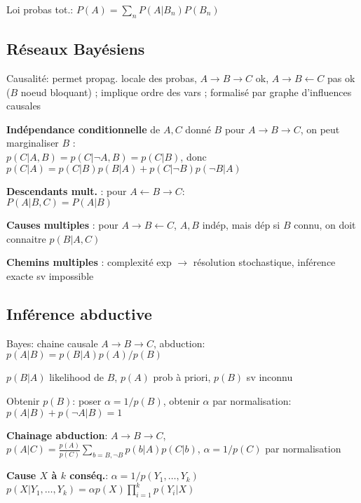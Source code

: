 Loi probas tot.: $P(A) = \sum_n P(A|B_n)P(B_n)$

\subsection*{Réseaux Bayésiens}

Causalité: permet propag. locale des probas, $A \rightarrow B \rightarrow C$ ok, $A \rightarrow B \leftarrow C$ pas ok ($B$ noeud bloquant) ; implique ordre des vars ; formalisé par graphe d'influences causales


\textbf{Indépendance conditionnelle} de $A, C$ donné $B$ pour $A \rightarrow B \rightarrow C$, on peut marginaliser $B$ : \\
$p(C|A, B) = p(C|\lnot A, B) = p(C|B)$, donc \\
$p(C|A) = p(C|B)p(B|A) + p(C|\lnot B)p(\lnot B|A)$

\textbf{Descendants mult.} : pour $A \leftarrow B \rightarrow C$:\\ 
$P(A|B, C) = P(A|B)$

\textbf{Causes multiples} : pour $A \rightarrow B \leftarrow C$, $A, B$ indép, mais dép si $B$ connu, on doit connaitre $p(B|A,C)$

\textbf{Chemins multiples} : complexité exp $\rightarrow$ résolution stochastique, inférence exacte sv impossible


\subsection*{Inférence abductive}

Bayes: chaine causale $A \rightarrow B \rightarrow C$, abduction: $p(A|B) = p(B|A)p(A) / p(B)$

$p(B|A)$ likelihood de $B$, $p(A)$ prob à priori, $p(B)$ sv inconnu

Obtenir $p(B)$: poser $\alpha = 1/p(B)$, obtenir $\alpha$ par normalisation: $p(A|B) + p(\lnot A |B) = 1$

\textbf{Chainage abduction}: $A \rightarrow B \rightarrow C$, $p(A|C) = \frac{p(A)}{p(C)} \sum_{b=B,\lnot B} p(b|A)p(C|b)$, $\alpha=1/p(C)$ par normalisation

\textbf{Cause $X$ à $k$ conséq.}: $\alpha = 1/p(Y_1,\dots,Y_k)$ $p(X|Y_1,\dots, Y_k) = \alpha p(X) \prod_{i=1}^k p(Y_i|X)$

